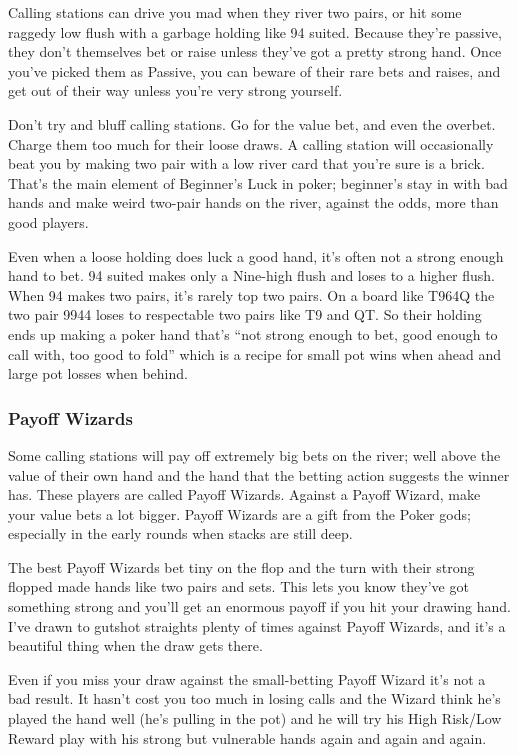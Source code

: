 Calling stations can drive you mad when they river two pairs,
or hit some raggedy low flush with a garbage holding like 94 suited.
Because they're passive, they don't themselves bet or raise unless
they've got a pretty strong hand. Once you've picked them as
Passive, you can beware of their rare bets and raises, and get out of
their way unless you're very strong yourself.

Don't try and bluff calling stations. Go for the value bet,
and even the overbet. Charge them too much for their loose draws.
A calling station will occasionally beat you by making two pair with a
low river card that you're sure is a brick. That's the main element of
Beginner's Luck in poker; beginner's stay in with bad hands and make
weird two-pair hands on the river, against the odds, more than good
players.

Even when a loose holding does luck a good hand, it's often
not a strong enough hand to bet. 94 suited makes only a Nine-high
flush and loses to a higher flush. When 94 makes two pairs,
it's rarely top two pairs. On a board like T964Q the two pair 9944
loses to respectable two pairs like T9 and QT. So their
holding ends up making a poker hand that's ``not strong enough to bet,
good enough to call with, too good to fold'' which is a recipe for
small pot wins when ahead and large pot losses when behind.

\subsubsection{Payoff Wizards}

Some calling stations will pay off extremely big bets on the river; well
above the value of their own hand and the hand that the betting action
suggests the winner has. These players are called Payoff
Wizards. Against a Payoff Wizard, make your value bets a
lot bigger. Payoff Wizards are a gift from the
Poker gods; especially in the early rounds when stacks are still
deep.

The best Payoff Wizards bet tiny on the flop and the
turn with their strong flopped made hands like two pairs and sets.
This lets you know they've got something strong and you'll
get an enormous payoff if you hit your drawing hand. I've drawn to
gutshot straights plenty of times against Payoff Wizards, and it's a
beautiful thing when the draw gets there.

Even if you miss your draw against the small-betting Payoff Wizard
it's not a bad result. It hasn't cost you too much in losing calls and
the Wizard think he's played the hand well (he's pulling in the pot)
and he will try his High Risk/Low Reward play with his strong but
vulnerable hands again and again and again.

